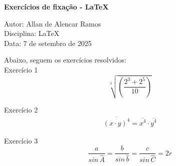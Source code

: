 \documentclass[12pt, a4paper]{article}
\begin{document}
\begin{center}
	\textbf{\large Exercícios de fixação - LaTeX}
\end{center}

\vspace{0.25cm}

\begin{flushleft}
Autor: Allan de Alencar Ramos \\
Disciplina: LaTeX \\
Data: 7 de setembro de 2025
\end{flushleft}

Abaixo, seguem os exercícios resolvidos: \\

Exercício 1 \\
\begin{equation}
\sqrt[3]{ \left(\frac{ 2^{3} + 2^{5} }{10}\right) }
\end{equation}

Exercício 2 \\
\begin{eqnarray}
\overline{ (x \cdot y)^{4} } = \overline{x^{4}} \cdot \overline{y^{4}}
\end{eqnarray}

Exercício 3 \\
\begin{equation}
\frac{a}{sin \, \widehat{A}} = 
\frac{b}{sin \, \widehat{b}} = 
\frac{c}{sin \, \widehat{C}} = 2r
\end{equation}
\end{document}
